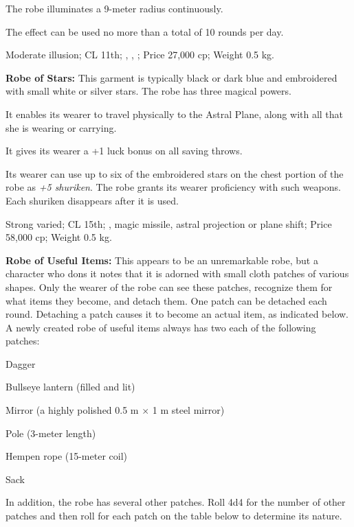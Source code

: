 The robe illuminates a 9-meter radius continuously.

The effect can be used no more than a total of 10 rounds per day.

Moderate illusion; CL 11th; , , ; Price 27,000 cp; Weight 0.5 kg.

\textbf{Robe of Stars:} This garment is typically black or dark blue and embroidered with small white or silver stars. The robe has three magical powers.

\begin{itemize*}
\item It enables its wearer to travel physically to the Astral Plane, along with all that she is wearing or carrying.
\item It gives its wearer a +1 luck bonus on all saving throws.
\item Its wearer can use up to six of the embroidered stars on the chest portion of the robe as \emph{+5 shuriken}. The robe grants its wearer proficiency with such weapons. Each shuriken disappears after it is used.
\end{itemize*}

Strong varied; CL 15th; , magic missile, astral projection or plane shift; Price 58,000 cp; Weight 0.5 kg.

\textbf{Robe of Useful Items:} This appears to be an unremarkable robe, but a character who dons it notes that it is adorned with small cloth patches of various shapes. Only the wearer of the robe can see these patches, recognize them for what items they become, and detach them. One patch can be detached each round. Detaching a patch causes it to become an actual item, as indicated below. A newly created robe of useful items always has two each of the following patches:

\begin{itemize*}
\item Dagger
\item Bullseye lantern (filled and lit)
\item Mirror (a highly polished 0.5 m $\times$ 1 m steel mirror)
\item Pole (3-meter length)
\item Hempen rope (15-meter coil)
\item Sack
\end{itemize*}

In addition, the robe has several other patches. Roll 4d4 for the number of other patches and then roll for each patch on the table below to determine its nature.

